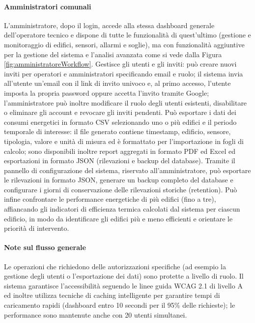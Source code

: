 \paragraph{Amministratori comunali}
L'amministratore, dopo il login, accede alla stessa dashboard generale dell'operatore tecnico e dispone di tutte le funzionalità di quest'ultimo (gestione e monitoraggio di edifici, sensori, allarmi e soglie), ma con funzionalità aggiuntive per la gestione del sistema e l'analisi avanzata come si vede dalla Figura \ref{fig:amministratoreWorkflow}. Gestisce gli utenti e gli inviti: può creare nuovi inviti per operatori e amministratori specificando email e ruolo; il sistema invia all'utente un'email con il link di invito univoco e, al primo accesso, l'utente imposta la propria password oppure accetta l'invito tramite Google; l'amministratore può inoltre modificare il ruolo degli utenti esistenti, disabilitare o eliminare gli account e revocare gli inviti pendenti. Può esportare i dati dei consumi energetici in formato CSV selezionando uno o più edifici e il periodo temporale di interesse: il file generato contiene timestamp, edificio, sensore, tipologia, valore e unità di misura ed è formattato per l'importazione in fogli di calcolo; sono disponibili inoltre report aggregati in formato PDF ed Excel ed esportazioni in formato JSON (rilevazioni e backup del database). Tramite il pannello di configurazione del sistema, riservato all'amministratore, può esportare le rilevazioni in formato JSON, generare un backup completo del database e configurare i giorni di conservazione delle rilevazioni storiche (retention). Può infine confrontare le performance energetiche di più edifici (fino a tre), affiancando gli indicatori di efficienza termica calcolati dal sistema per ciascun edificio, in modo da identificare gli edifici più e meno efficienti e orientare le priorità di intervento.


\paragraph{Note sul flusso generale}
Le operazioni che richiedono delle autorizzazioni specifiche (ad esempio la gestione degli utenti o l'esportazione dei dati) sono protette a livello di ruolo. Il sistema garantisce l'accessibilità seguendo le linee guida WCAG 2.1 di livello A ed inoltre utilizza tecniche di caching intelligente per garantire tempi di caricamento rapidi (dashboard entro 10 secondi per il 95\% delle richieste); le performance sono mantenute anche con 20 utenti simultanei.

